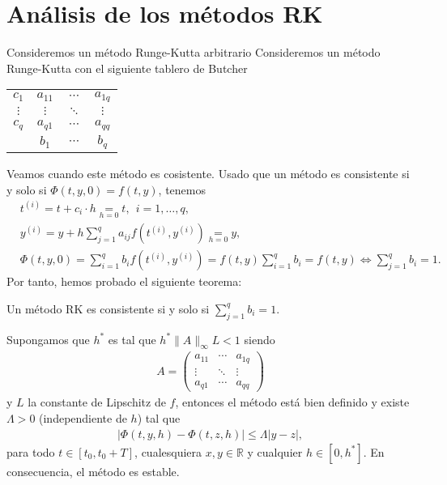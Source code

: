 \section{Análisis de los métodos RK}
Consideremos un método Runge-Kutta arbitrario
Consideremos un método Runge-Kutta con el siguiente tablero de Butcher
\begin{tabular}{c|ccc}
    $c_1$    & $a_{11}$ & $\cdots$ & $a_{1q}$ \\
    $\vdots$ & $\vdots$ & $\ddots$ & $\vdots$ \\
    $c_q$    & $a_{q1}$ & $\cdots$ & $a_{qq}$ \\
    \hline
             & $b_1$    & $\cdots$ & $b_q$
\end{tabular}
Veamos cuando este método es cosistente. Usado que un método es consistente si y solo si $\Phi(t,y,0) = f(t,y)$, tenemos
\begin{align*}
     & t^{(i)} = t + c_i \cdot h \underset{h = 0}{=} t, \ \ i = 1,\ldots,q,                                                                           \\
     & y^{(i)} = y + h\sum_{j=1}^{q} a_{ij}f\left( t^{(i)},y^{(i)}  \right) \underset{h = 0}{=} y,                                                    \\
     & \Phi(t,y,0) = \sum_{i=1}^{q} b_if\left(t^{(i)},y^{(i)}\right) = f(t,y) \sum_{i=1}^{q} b_i = f(t,y) \Longleftrightarrow \sum_{j=1}^{q} b_i = 1.
\end{align*}
Por tanto,  hemos probado el siguiente teorema:

\begin{teo}
    Un método RK es consistente si y solo si $\sum_{j=1}^{q} b_i = 1$.
\end{teo}

\begin{teo}
    Supongamos que $h^*$ es tal que $h^* \| A\|_{\infty} L < 1$ siendo
    \begin{align*}
        A = \begin{pmatrix}
                a_{11} & \cdots & a_{1q} \\
                \vdots & \ddots & \vdots \\
                a_{q1} & \cdots & a_{qq}
            \end{pmatrix}
    \end{align*}
    y $L$ la constante de Lipschitz de $f$, entonces el método está bien definido y existe $\Lambda > 0$ (independiente de $h$) tal que \begin{align*}
        |\Phi(t,y,h) - \Phi(t,z,h)| \leq \Lambda|y-z|,
    \end{align*}
    para todo $t \in [t_0,t_0+T]$, cualesquiera $x,y \in \mathbb{R}$ y cualquier $h \in [0,h^*]$. En consecuencia, el método es estable.
\end{teo}

